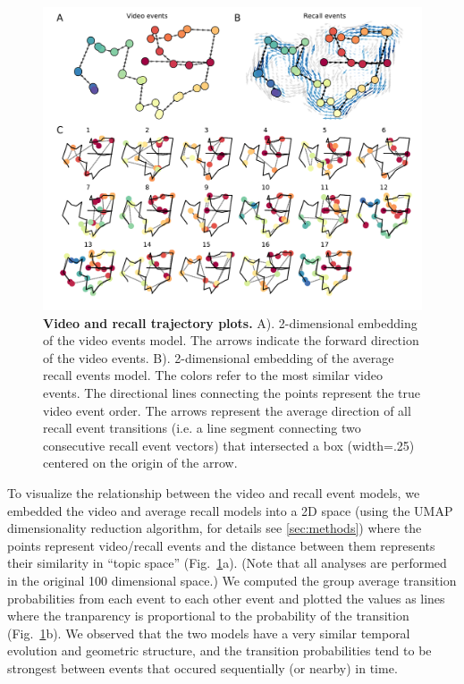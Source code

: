 \documentclass{article}
\begin{document}
{\begin{figure}[t!]
\centering
\includegraphics[width=1\textwidth]{figs/4_trajectory.pdf}
\caption{\small \textbf{Video and recall trajectory plots.} A). 2-dimensional embedding of the video events model. The arrows indicate the forward direction of the video events. B). 2-dimensional embedding of the average recall events model.  The colors refer to the most similar video events. The directional lines connecting the points represent the true video event order. The arrows represent the average direction of all recall event transitions (i.e. a line segment connecting two consecutive recall event vectors) that intersected a box (width=.25) centered on the origin of the arrow.}
\label{fig:trajectory}
\end{figure}

To visualize the relationship between the video and recall event models, we embedded the video and average recall models into a 2D space (using the UMAP dimensionality reduction algorithm, for details see \ref{sec:methods}) where the points represent video/recall events and the distance between them represents their similarity in ``topic space'' (Fig.~\ref{fig:trajectory}a). (Note that all analyses are performed in the original 100 dimensional space.) We computed the group average transition probabilities from each event to each other event and plotted the values as lines where the tranparency is proportional to the probability of the transition (Fig.~\ref{fig:trajectory}b).  We observed that the two models have a very similar temporal evolution and geometric structure, and the transition probabilities tend to be strongest between events that occured sequentially (or nearby) in time.

}
\end{document}
